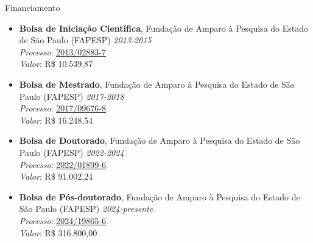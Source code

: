 \documentclass{resume}
\begin{document}

\begin{rSection}{Financiamento} 
\begin{itemize}
\item {\bf Bolsa de Iniciação Científica}, Fundação de Amparo à Pesquisa do Estado de São Paulo (FAPESP) \hfill{\em 2013-2015}\\
{\it Processo}: \href{https://bv.fapesp.br/en/bolsas/142421/effect-of-fragmentation-on-the-persistence-of-anuran-amphibians-amphibia-anura-within-the-atlanti/}{\underline{2013/02883-7}}\\
{\it Valor}: R\$ 10.539,87

\item {\bf Bolsa de Mestrado}, Fundação de Amparo à Pesquisa do Estado de São Paulo (FAPESP) \hfill{\em 2017-2018}\\
{\it Processo}: \href{https://bv.fapesp.br/en/bolsas/172826/effect-of-landscape-modifications-and-climate-changes-on-the-persistence-of-amphibians-in-the-atlant/}{\underline{2017/09676-8}}\\
{\it Valor}: R\$ 16.248,54

\item {\bf Bolsa de Doutorado}, Fundação de Amparo à Pesquisa do Estado de São Paulo (FAPESP) \hfill{\em 2022-2024}\\
{\it Processo}: \href{https://bv.fapesp.br/en/bolsas/203713/landscape-structure-as-a-predictor-of-taxonomic-and-functional-diversity-of-amphibians-in-the-atlant/}{\underline{2022/01899-6}}\\
{\it Valor}: R\$ 91.002,24

\item {\bf Bolsa de Pós-doutorado}, Fundação de Amparo à Pesquisa do Estado de São Paulo (FAPESP) \hfill{\em 2024-presente}\\
{\it Processo}: \href{https://bv.fapesp.br/en/bolsas/223203/impacts-of-edge-effects-fire-and-climate-change-on-vegetation-composition-and-functional-diversity-a/}{\underline{2024/19865-6}}\\
{\it Valor}: R\$ 316.800,00
\end{itemize}
\end{rSection}

\end{document}
